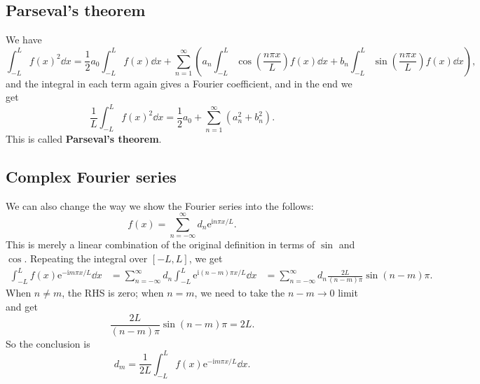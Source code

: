 \documentclass[hyperref, a4paper]{article}
\newcommand*{\ii}{\mathrm{i}}
\newcommand*{\ee}{\mathrm{e}}
\newcommand*{\concept}[1]{{\textbf{#1}}}
\def\\{}%
\begin{document}
\subsection{Parseval's theorem}

We have 
\[
    \int_{-L}^{L} f(x)^2 \dd{x} 
    = \frac{1}{2} a_0 \int_{-L}^{L} f(x) \dd{x}
    + \sum_{n=1}^{\infty} \left(
        a_n \int_{-L}^{L} \cos(\frac{n \pi x}{L}) f(x) \dd{x}
        + b_n \int_{-L}^{L} \sin(\frac{n \pi x}{L}) f(x) \dd{x}
    \right),
\]
and the integral in each term again gives a Fourier coefficient,
and in the end we get 
\begin{equation}
    \frac{1}{L} \int_{-L}^{L} f(x)^2 \dd{x}
    = \frac{1}{2} a_0 
    + \sum_{n=1}^{\infty} (a_n^2 + b_n^2). 
\end{equation}
This is called \concept{Parseval's theorem}. 

\subsection{Complex Fourier series}\label{sec:fourier-series.complex}

We can also change the way we show the Fourier series into the follows: 
\begin{equation}
    f(x) = \sum_{n=-\infty}^{\infty} d_n \ee^{\ii n \pi x / L}.
\end{equation}
This is merely a linear combination of the original definition in terms of $\sin$ and $\cos$.
Repeating the integral over $[-L, L]$, we get 
\[
    \begin{aligned}
        \int_{-L}^{L} f(x) \ee^{- \ii m \pi x / L} \dd{x} 
        &= \sum_{n=-\infty}^{\infty} d_n
        \int_{-L}^{L}  \ee^{\ii (n - m) \pi x / L} \dd{x} \\
        &= \sum_{n=-\infty}^{\infty} d_n
        \frac{2 L }{(n - m) \pi} \sin (n - m) \pi. 
    \end{aligned}
\] 
When $n \neq m$, the RHS is zero; 
when $n = m$, we need to take the $n - m \to 0$ limit and get 
\[
    \frac{2 L }{(n - m) \pi} \sin (n - m) \pi = 2 L.  
\]
So the conclusion is 
\begin{equation}
    d_m = \frac{1}{2L} 
        \int_{-L}^{L} f(x) \ee^{- \ii m \pi x / L} \dd{x} .
\end{equation}
\end{document}
